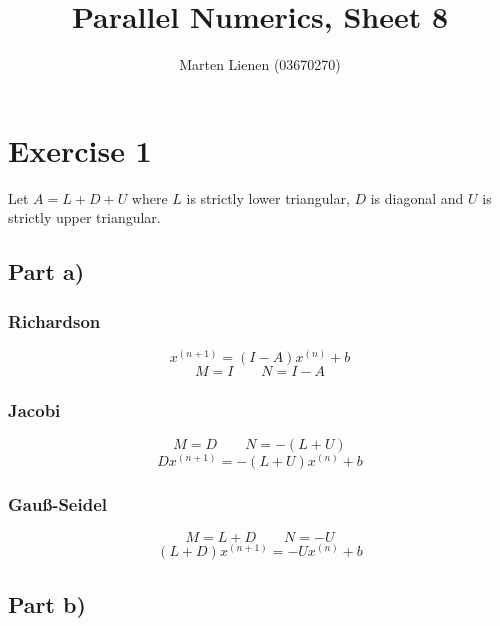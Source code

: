 \documentclass[10pt,a4paper]{article}
\title{Parallel Numerics, Sheet 8}
\author{Marten Lienen (03670270)}
\begin{document}
\maketitle

\section*{Exercise 1}

Let $A = L + D + U$ where $L$ is strictly lower triangular, $D$ is diagonal and $U$ is strictly upper triangular.

\subsection*{Part a)}

\subsubsection*{Richardson}

\begin{equation*}
  x^{(n + 1)} = (I - A)x^{(n)} + b
\end{equation*}
\begin{equation*}
  M = I \qquad N = I - A
\end{equation*}

\subsubsection*{Jacobi}

\begin{equation*}
  M = D \qquad N = -(L + U)
\end{equation*}
\begin{equation*}
  Dx^{(n + 1)} = -(L + U)x^{(n)} + b
\end{equation*}

\subsubsection*{Gauß-Seidel}

\begin{equation*}
  M = L + D \qquad N = -U
\end{equation*}
\begin{equation*}
  (L + D)x^{(n + 1)} = -Ux^{(n)} + b
\end{equation*}

\subsection*{Part b)}
\end{document}
